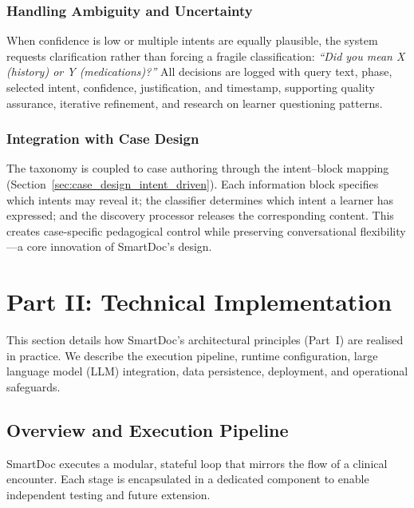 \subsubsection{Handling Ambiguity and Uncertainty}

When confidence is low or multiple intents are equally plausible, the system
requests clarification rather than forcing a fragile classification:
\emph{``Did you mean X (history) or Y (medications)?''}  
All decisions are logged with query text, phase, selected intent, confidence,
justification, and timestamp, supporting quality assurance, iterative refinement,
and research on learner questioning patterns.

\subsubsection{Integration with Case Design}

The taxonomy is coupled to case authoring through the intent–block mapping
(Section~\ref{sec:case_design_intent_driven}). Each information block specifies
which intents may reveal it; the classifier determines which intent a learner
has expressed; and the discovery processor releases the corresponding content.
This creates case-specific pedagogical control while preserving conversational
flexibility—a core innovation of SmartDoc’s design.

\section{Part II: Technical Implementation}
\label{sec:tech_impl}

This section details how SmartDoc’s architectural principles (Part~I) are realised
in practice. We describe the execution pipeline, runtime configuration, large language
model (LLM) integration, data persistence, deployment, and operational safeguards.

\subsection{Overview and Execution Pipeline}
\label{sec:pipeline_overview}

SmartDoc executes a modular, stateful loop that mirrors the flow of a clinical
encounter. Each stage is encapsulated in a dedicated component to enable independent
testing and future extension.

